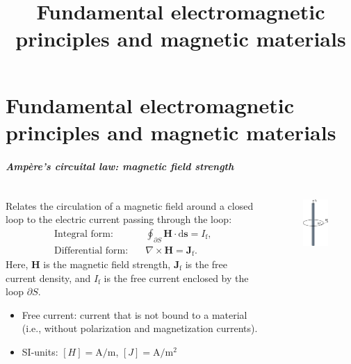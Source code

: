 \part{Fundamental electromagnetic principles and magnetic materials}
\title[Electromagnetic and material fundamentals]{Fundamental electromagnetic principles and magnetic materials}  
\date{}  
\frame{\titlepage} 

\begin{frame}
	\frametitle{Amp\`ere's circuital law: magnetic field strength}
	\begin{columns}
		\begin{column}{0.55\textwidth}
			Relates the circulation of a magnetic field around a closed loop to the electric current passing through the loop:
            \begin{align}
                \mbox{Integral form:} \quad &\oint_{\partial S} \bm{H} \cdot \mathrm{d}\bm{s} = I_{\mathrm{f}},\\
                \mbox{Differential form:} \quad &\nabla \times \bm{H} = \bm{J}_{\mathrm{f}}. 
                \label{eq:ampere_law}
            \end{align}
            Here, $\bm{H}$ is the magnetic field strength, $\bm{J}_{\mathrm{f}}$ is the free current density, and $I_{\mathrm{f}}$ is the free current enclosed by the loop $\partial S$. 
            \vspace{0.25cm}
            \begin{itemize}
                \item<2-> Free current: current that is not bound to a material (i.e., without polarization and magnetization currents).
                \item<3-> SI-units: $[H] = \si{\ampere\per\metre}$, $[J] = \si{\ampere\per\metre\squared}$
            \end{itemize}
		\end{column}
        \hfill
		\begin{column}{0.4\textwidth}
			\begin{figure}
				\centering
				\includegraphics[height=0.7\textheight]{fig/lec02/Magnetic_field_strength_simple_conductor.pdf}

\end{figure}
\end{column}
\end{columns}
\end{frame}
